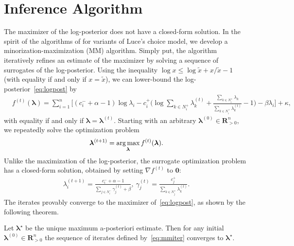 \section{Inference Algorithm}  %
\label{sec:algorithm}

The maximizer of the log-posterior does not have a closed-form solution.
In the spirit of the algorithms of \citet{hunter2004mm} for variants of Luce's choice model, we develop a minorization-maximization (MM) algorithm.
Simply put, the algorithm iteratively refines an estimate of the maximizer by solving a sequence of surrogates of the log-posterior.
Using the inequality $\log x \le \log \tilde{x} + x/\tilde{x} - 1$ (with equality if and only if $x = \tilde{x}$), we can lower-bound the log-posterior~\eqref{eq:logpost} by
\begin{align*}
&f^{(t)}(\bm{\lambda}) =
    \sum_{i = 1}^n \bigg[ (c^-_i + \alpha - 1) \log \lambda_i 
                         - c^+_i \bigg( \log\!\sum_{k \in N^+_i}\!\lambda^{(t)}_k
                                       +\frac{\sum_{k \in N^+_i}\!\lambda_k}{\sum_{k \in N^+_i}\!\lambda^{(t)}_k} -1 \bigg)
                         - \beta \lambda_i \bigg] + \kappa,
\end{align*}
with equality if and only if $\bm{\lambda} = \bm{\lambda}^{(t)}$.
Starting with an arbitrary $\bm{\lambda}^{(0)} \in \mathbf{R}^n_{>0}$, we repeatedly solve the optimization problem
\begin{align*}
\bm{\lambda}^{(t+1)} = \operatorname*{arg\,max}_{\bm{\lambda}} f^{(t)}(\bm{\lambda}).
\end{align*}
Unlike the maximization of the log-posterior, the surrogate optimization problem has a closed-form solution, obtained by setting $\nabla f^{(t)}$ to $\bm{0}$:
\begin{align}
\label{eq:mmiter}
\lambda_i^{(t + 1)} = \frac{c^-_i + \alpha - 1}{\sum_{j \in N^-_i} \gamma_j^{(t)} + \beta},
\ \gamma_j^{(t)} = \frac{c^+_j}{\sum_{k \in N^+_j} \lambda_k^{(t)}}.
\end{align}
The iterates provably converge to the maximizer of~\eqref{eq:logpost}, as shown by the following theorem.

\begin{theorem}
\label{thm:mmconv}
Let $\bm{\lambda}^\star$ be the unique maximum a-posteriori estimate.
Then for any initial $\bm{\lambda}^{(0)} \in \mathbf{R}^n_{> 0}$ the sequence of iterates defined by~\eqref{eq:mmiter} converges to $\bm{\lambda}^\star$.
\end{theorem}

